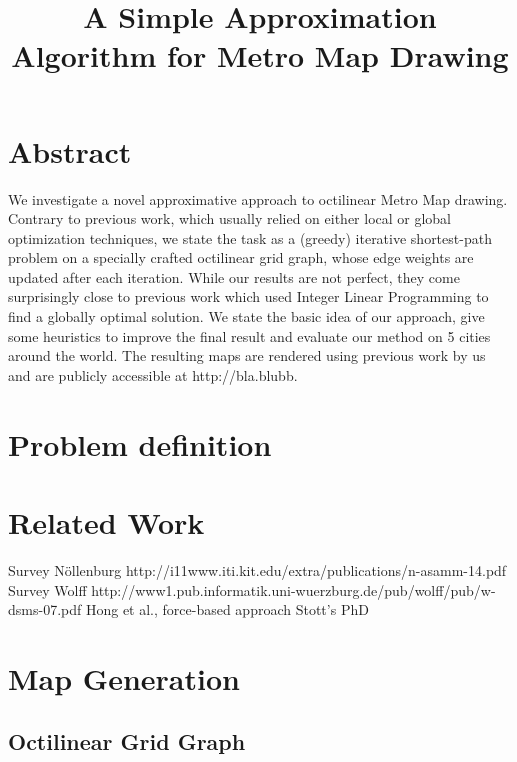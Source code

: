 \documentclass{sig-alternate-sigmod09}
\begin{document}
\title{A Simple Approximation Algorithm for Metro Map Drawing}


\maketitle

\section{Abstract}

We investigate a novel approximative approach to octilinear Metro Map drawing. Contrary to previous work, which usually relied on either local or global optimization techniques, we state the task as a (greedy) iterative shortest-path problem on a specially crafted octilinear grid graph, whose edge weights are updated after each iteration. While our results are not perfect, they come surprisingly close to previous work which used Integer Linear Programming to find a globally optimal solution. We state the basic idea of our approach, give some heuristics to improve the final result and evaluate our method on 5 cities around the world. The resulting maps are rendered using previous work by us and are publicly accessible at http://bla.blubb. 

\section{Problem definition}

\section{Related Work}

Survey Nöllenburg http://i11www.iti.kit.edu/extra/publications/n-asamm-14.pdf
Survey Wolff http://www1.pub.informatik.uni-wuerzburg.de/pub/wolff/pub/w-dsms-07.pdf
Hong et al., force-based approach
Stott's PhD



\section{Map Generation}

\subsection{Octilinear Grid Graph}
\end{document}
